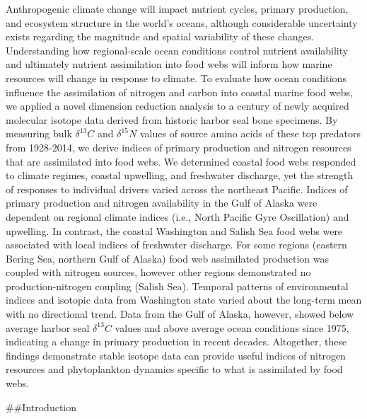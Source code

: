 \documentclass [11pt, proquest] {uwthesis}[2015/03/03]
\begin{document}
Anthropogenic climate change will impact nutrient cycles, primary production, and ecosystem structure in the world's oceans, although considerable uncertainty exists regarding the magnitude and spatial variability of these changes. Understanding how regional-scale ocean conditions control nutrient availability and ultimately nutrient assimilation into food webs will inform how marine resources will change in response to climate. To evaluate how ocean conditions influence the assimilation of nitrogen and carbon into coastal marine food webs, we applied a novel dimension reduction analysis to a century of newly acquired molecular isotope data derived from historic harbor seal bone specimens. By measuring bulk \(\delta^{13}C\) and \(\delta^{15}N\) values of source amino acids of these top predators from 1928-2014, we derive indices of primary production and nitrogen resources that are assimilated into food webs. We determined coastal food webs responded to climate regimes, coastal upwelling, and freshwater discharge, yet the strength of responses to individual drivers varied across the northeast Pacific. Indices of primary production and nitrogen availability in the Gulf of Alaska were dependent on regional climate indices (i.e., North Pacific Gyre Oscillation) and upwelling. In contrast, the coastal Washington and Salish Sea food webs were associated with local indices of freshwater discharge. For some regions (eastern Bering Sea, northern Gulf of Alaska) food web assimilated production was coupled with nitrogen sources, however other regions demonstrated no production-nitrogen coupling (Salish Sea). Temporal patterns of environmental indices and isotopic data from Washington state varied about the long-term mean with no directional trend. Data from the Gulf of Alaska, however, showed below average harbor seal \(\delta^{13}C\) values and above average ocean conditions since 1975, indicating a change in primary production in recent decades. Altogether, these findings demonstrate stable isotope data can provide useful indices of nitrogen resources and phytoplankton dynamics specific to what is assimilated by food webs.

\#\#Introduction
\end{document}
